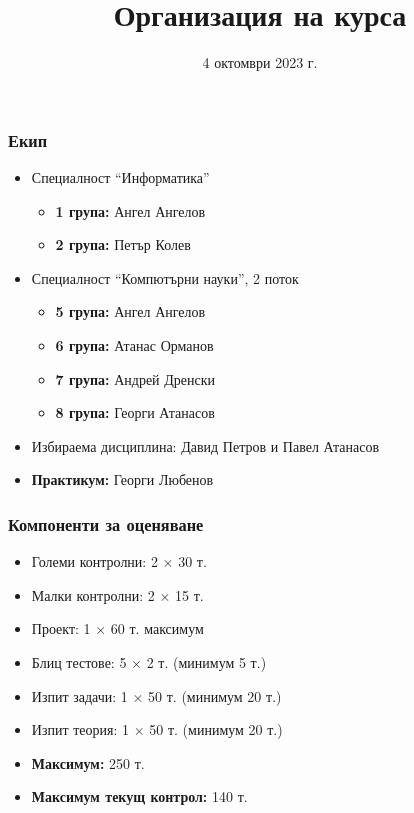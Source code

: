 \documentclass[alsotrans]{beamerswitch}
\title{Организация на курса}
\date{4 октомври 2023 г.}
\begin{document}
\begin{frame}
  \titlepage
\end{frame}

\begin{frame}
  \frametitle{Екип}

  \begin{itemize}
  \item Специалност ``Информатика''
    \begin{itemize}
    \item \textbf{1 група:} Ангел Ангелов
    \item \textbf{2 група:} Петър Колев
    \end{itemize}
  \item Специалност ``Компютърни науки'', 2 поток
    \begin{itemize}
    \item \textbf{5 група:} Ангел Ангелов
    \item \textbf{6 група:} Атанас Орманов
    \item \textbf{7 група:} Андрей Дренски
    \item \textbf{8 група:} Георги Атанасов
    \end{itemize}
  \item Избираема дисциплина: Давид Петров и Павел Атанасов
  \item \textbf{Практикум:} Георги Любенов
\end{itemize}
\end{frame}

\begin{frame}
  \frametitle{Компоненти за оценяване}

  \begin{itemize}
  \item Големи контролни: 2 $\times$ 30 т.
  \item Малки контролни: 2 $\times$ 15 т.
  \item Проект: 1 $\times$ 60 т. максимум
  \item Блиц тестове: 5 $\times$ 2 т. \alert{(минимум 5 т.)}
  \item Изпит задачи: 1 $\times$ 50 т. \alert{(минимум 20 т.)}
  \item Изпит теория: 1 $\times$ 50 т. \alert{(минимум 20 т.)}
  \item \textbf{Максимум:} 250 т.
  \item \textbf{Максимум текущ контрол:} 140 т.
  \end{itemize}
\end{frame}
\end{document}
